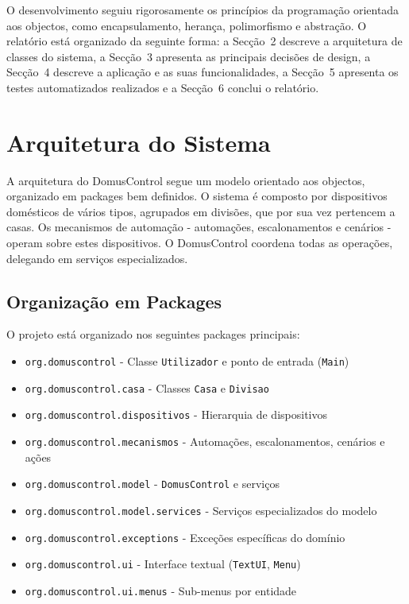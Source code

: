 \documentclass[a4paper]{article}
\begin{document}
O desenvolvimento seguiu rigorosamente os princípios da programação orientada aos objectos, como encapsulamento, herança, polimorfismo e abstração. O relatório está organizado da seguinte forma: a Secção~2 descreve a arquitetura de classes do sistema, a Secção~3 apresenta as principais decisões de design, a Secção~4 descreve a aplicação e as suas funcionalidades, a Secção~5 apresenta os testes automatizados realizados e a Secção~6 conclui o relatório.

\section{Arquitetura do Sistema}

A arquitetura do DomusControl segue um modelo orientado aos objectos, organizado em packages bem definidos. O sistema é composto por dispositivos domésticos de vários tipos, agrupados em divisões, que por sua vez pertencem a casas. Os mecanismos de automação - automações, escalonamentos e cenários - operam sobre estes dispositivos. O DomusControl coordena todas as operações, delegando em serviços especializados.

\subsection{Organização em Packages}

O projeto está organizado nos seguintes packages principais:

\begin{itemize}
    \item \texttt{org.domuscontrol} - Classe \texttt{Utilizador} e ponto de entrada (\texttt{Main})
    \item \texttt{org.domuscontrol.casa} - Classes \texttt{Casa} e \texttt{Divisao}
    \item \texttt{org.domuscontrol.dispositivos} - Hierarquia de dispositivos
    \item \texttt{org.domuscontrol.mecanismos} - Automações, escalonamentos, cenários e ações
    \item \texttt{org.domuscontrol.model} - \texttt{DomusControl} e serviços
    \item \texttt{org.domuscontrol.model.services} - Serviços especializados do modelo
    \item \texttt{org.domuscontrol.exceptions} - Exceções específicas do domínio
    \item \texttt{org.domuscontrol.ui} - Interface textual (\texttt{TextUI}, \texttt{Menu})
    \item \texttt{org.domuscontrol.ui.menus} - Sub-menus por entidade
\end{itemize}
\end{document}
